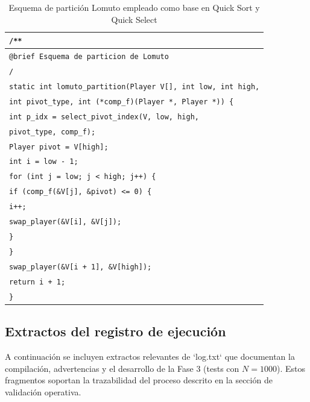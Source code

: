 \begin{table}[H]
\centering
\caption{Esquema de partición Lomuto empleado como base en Quick Sort y Quick Select}
\label{lst:lomuto}
\begin{tabular}{|p{\dimexpr\linewidth-2\tabcolsep-2\arrayrulewidth\relax}|}
\hline
\texttt{\small /**} \\
\hline
\texttt{\small  * @brief Esquema de particion de Lomuto} \\
\hline
\texttt{\small  */} \\
\hline
\texttt{\small static int lomuto\_partition(Player V[], int low, int high,} \\
\hline
\texttt{\small \phantom{xx}int pivot\_type, int (*comp\_f)(Player *, Player *)) \{} \\
\hline
\texttt{\small \phantom{xxxx}int p\_idx = select\_pivot\_index(V, low, high,} \\
\hline
\texttt{\small \phantom{xxxxxxxxxxxx}pivot\_type, comp\_f);} \\
\hline
\texttt{\small \phantom{xxxx}Player pivot = V[high];} \\
\hline
\texttt{\small \phantom{xxxx}int i = low - 1;} \\
\hline
\texttt{\small \phantom{xxxx}for (int j = low; j < high; j++) \{} \\
\hline
\texttt{\small \phantom{xxxxxxxx}if (comp\_f(\&V[j], \&pivot) <= 0) \{} \\
\hline
\texttt{\small \phantom{xxxxxxxxxxxx}i++;} \\
\hline
\texttt{\small \phantom{xxxxxxxxxxxx}swap\_player(\&V[i], \&V[j]);} \\
\hline
\texttt{\small \phantom{xxxxxxxx}\}} \\
\hline
\texttt{\small \phantom{xxxx}\}} \\
\hline
\texttt{\small \phantom{xxxx}swap\_player(\&V[i + 1], \&V[high]);} \\
\hline
\texttt{\small \phantom{xxxx}return i + 1;} \\
\hline
\texttt{\small \}} \\
\hline
\end{tabular}
\end{table}

\subsection{Extractos del registro de ejecución}\label{sec:anexos_log}
A continuación se incluyen extractos relevantes de `log.txt` que documentan la compilación, advertencias y el desarrollo de la Fase 3 (tests con $N=1000$). Estos fragmentos soportan la trazabilidad del proceso descrito en la sección de validación operativa.



